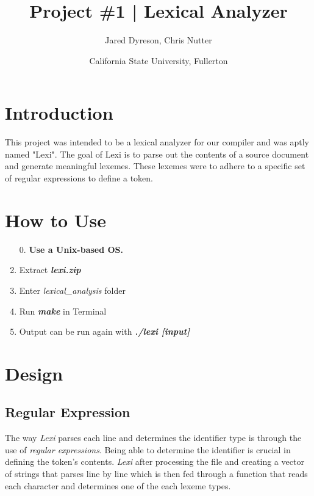 \documentclass{article}
\title{Project \#1 | Lexical Analyzer}
\author{Jared Dyreson, Chris Nutter}
\date{California State University, Fullerton}
\begin{document}
\maketitle
\tableofcontents
\newpage

\section{Introduction}
This project was intended to be a lexical analyzer for our compiler and was aptly named "Lexi".
The goal of Lexi is to parse out the contents of a source document and generate meaningful lexemes.
These lexemes were to adhere to a specific set of regular expressions to define a token.
\section{How to Use}
   \begin{enumerate}
        \item[0.]\textbf{Use a Unix-based OS.}
        \item Extract \textbf{\emph{lexi.zip}}
        \item Enter \emph{lexical\_analysis} folder
        \item Run \textbf{\emph{make}} in Terminal
        \item Output can be run again with \textbf{\emph{./lexi [input]}}
   \end{enumerate}

\section{Design}
    \subsection{Regular Expression}
        The way \emph{Lexi} parses each line and determines the identifier type is through the use of \emph{regular expressions}. Being able to determine the identifier is crucial in defining the token's contents. \emph{Lexi} after processing the file and creating a vector of strings that parses line by line which is then fed through a function that reads each character and determines one of the each lexeme types.
\end{document}
